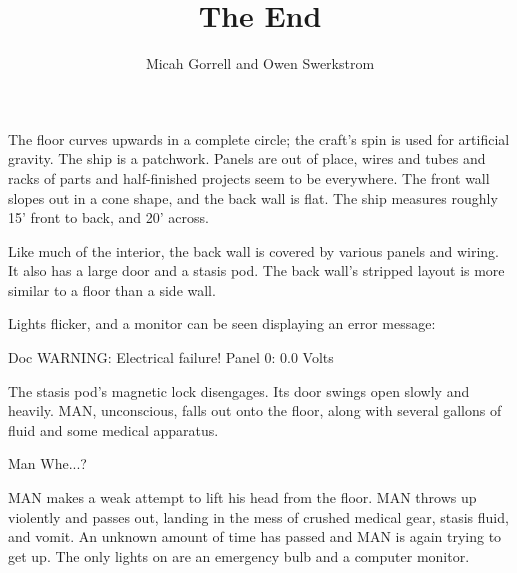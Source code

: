 \documentclass{screenplay}[2010/1/7]
\title{The End}
\author{Micah Gorrell and Owen Swerkstrom}
\begin{document}
\coverpage
\fadein
{}
The floor curves upwards in a complete circle; the craft's spin is used for artificial gravity.  The ship is a patchwork. Panels are out of place, wires and tubes and racks of parts and half-finished projects seem to be everywhere.  The front wall slopes out in a cone shape, and the back wall is flat.  The ship measures roughly 15' front to back, and 20' across.

Like much of the interior, the back wall is covered by various panels and wiring.  It also has a large door and a stasis pod.  The back wall's stripped layout is more similar to a floor than a side wall.

Lights flicker, and a monitor can be seen displaying an error message:
\begin{dialogue}[on-screen]{Doc}
WARNING: Electrical failure!
Panel 0: 0.0 Volts
\end{dialogue}
The stasis pod's magnetic lock disengages.  Its door swings open slowly and heavily.  MAN, unconscious, falls out onto the floor, along with several gallons of fluid and some medical apparatus.
\begin{dialogue}[groaning]{Man}
Whe...?
\end{dialogue}
MAN makes a weak attempt to lift his head from the floor.  MAN throws up violently and passes out, landing in the mess of crushed medical gear, stasis fluid, and vomit.
\fadeout
\fadein
An unknown amount of time has passed and MAN is again trying to get up.  The only lights on are an emergency bulb and a computer monitor.
\end{document}
